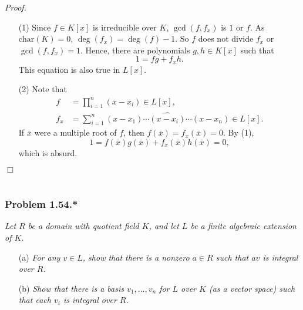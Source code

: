 \documentclass{article}
\begin{document}
\emph{Proof.}
\begin{enumerate}
\item[(1)]
  Since $f \in K[x]$ is irreducible over $K$,
  $\gcd(f, f_x)$ is $1$ or $f$.
  As $\mathrm{char}(K) = 0$, $\deg(f_x) = \deg(f) - 1$.
  So $f$ does not divide $f_x$ or $\gcd(f, f_x) = 1$.
  Hence, there are polynomials $g, h \in K[x]$ such that
  \[
    1 = f g + f_x h.
  \]
  This equation is also true in $L[x]$.

\item[(2)]
  Note that
  \begin{align*}
    f &= \prod_{i=1}^{n} (x - x_i) \in L[x], \\
    f_x &= \sum_{i=1}^{n} (x - x_1) \cdots \widehat{(x - x_i)} \cdots (x - x_n) \in L[x].
  \end{align*}
  If $\overline{x}$ were a multiple root of $f$,
  then $f(\overline{x}) = f_x(\overline{x}) = 0$.
  By (1),
  \[
    1 = f(\overline{x}) g(\overline{x}) + f_x(\overline{x}) h(\overline{x}) = 0,
  \]
  which is absurd.
\end{enumerate}
$\Box$ \\\\






\subsubsection*{Problem 1.54.*}
\emph{Let $R$ be a domain with quotient field $K$,
and let $L$ be a finite algebraic extension of $K$.}
\begin{enumerate}
\item[(a)]
  \emph{For any $v \in L$, show that there is a nonzero $a \in R$ such that
  $av$ is integral over $R$.}

\item[(b)]
  \emph{Show that there is a basis $v_1, \ldots, v_n$ for $L$ over $K$ (as a vector space)
  such that each $v_i$ is integral over $R$.} \\
\end{enumerate}
\end{document}
